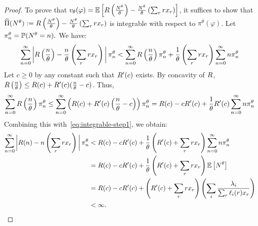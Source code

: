 \documentclass[12pt]{article}
\begin{document}
{\begin{proof}
To prove that $v_\theta(\varphi) = \mathbb{E}\left[R\left(\frac{N^\theta}{\theta}\right) - \frac{N^\theta}{\theta}\left(\sum_r r x_r \right)\right]$, it suffices to show that $\widehat{\Pi}(N^\theta) := R\left(\frac{N^\theta}{\theta}\right) - \frac{N^\theta}{\theta}\left(\sum_r r x_r \right)$ is integrable with respect to $\pi^\theta(\varphi)$. Let $\pi^\theta_n = \mathbb{P}(N^\theta = n).$ We have:
\begin{align}\label{eq:integrable-step1}
    \sum_{n=0}^{\infty} \bigg{|} R\left(\frac{n}{\theta}\right) - \frac{n}{\theta}\left(\sum_r rx_r\right)\bigg{|} \, \pi^\theta_n < \sum_{n=0}^{\infty} R\left(\frac{n}{\theta}\right)\pi^\theta_n + \frac1\theta\left(\sum_r rx_r\right)\sum_{n=0}^{\infty} n \pi^\theta_n
\end{align}
Let $c \geq 0$ by any constant such that $R'(c)$ exists. By concavity of $R$, $R\left(\frac{n}{\theta}\right) \leq R(c) + R'(c)(\frac{n}{\theta}-c)$. Thus, 
\begin{align*}
    \sum_{n=0}^{\infty} R\left(\frac{n}{\theta}\right)\pi^\theta_n \leq  \sum_{n=0}^{\infty} \left(R(c) + R'(c)\left(\frac{n}{\theta}-c\right)\right)\pi^\theta_n = R(c)-cR'(c) + \frac1\theta R'(c)\sum_{n=0}^{\infty} n\pi^\theta_n
\end{align*}
Combining this with~\eqref{eq:integrable-step1}, we obtain:
\begin{align*}
    \sum_{n=0}^{\infty} \bigg{|} R(n) - n\left(\sum_r rx_r\right)\bigg{|} \, \pi^\theta_n &< R(c) - cR'(c) + \frac1\theta\left(R'(c) + \sum_r rx_r\right) \sum_{n=0}^{\infty}n\pi^\theta_n \\
    & = R(c) - cR'(c) + \frac1\theta\left(R'(c) + \sum_r rx_r\right)\mathbb{E}\left[N^\theta\right] \\
    &= R(c) - cR'(c) + \left(R'(c) + \sum_r rx_r\right)\left(\sum_i \frac{\lambda_i}{\sum_r \ell_i(r)x_r}\right) \\
    &< \infty.
\end{align*}
\end{proof}


}
\end{document}
